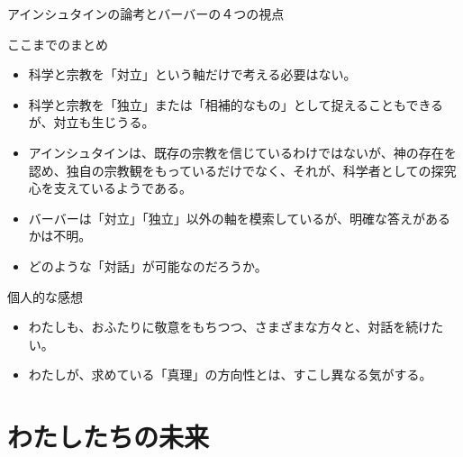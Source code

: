 \documentclass[10pt, dvipdfmx]{beamer}
\begin{document}
\begin{frame}{アインシュタインの論考とバーバーの４つの視点}

\begin{block}{ここまでのまとめ}
\begin{itemize}
\item 科学と宗教を「対立」という軸だけで考える必要はない。
\item 科学と宗教を「独立」または「相補的なもの」として捉えることもできるが、対立も生じうる。
\item アインシュタインは、既存の宗教を信じているわけではないが、神の存在を認め、独自の宗教観をもっているだけでなく、それが、科学者としての探究心を支えているようである。
\item バーバーは「対立」「独立」以外の軸を模索しているが、明確な答えがあるかは不明。
\item どのような「対話」が可能なのだろうか。
\end{itemize}

\end{block}

\begin{alertblock}{個人的な感想}
\begin{itemize}
\item わたしも、おふたりに敬意をもちつつ、さまざまな方々と、対話を続けたい。
\item わたしが、求めている「真理」の方向性とは、すこし異なる気がする。
\end{itemize}
\end{alertblock}

%
\end{frame}

\section{わたしたちの未来}
\end{document}
